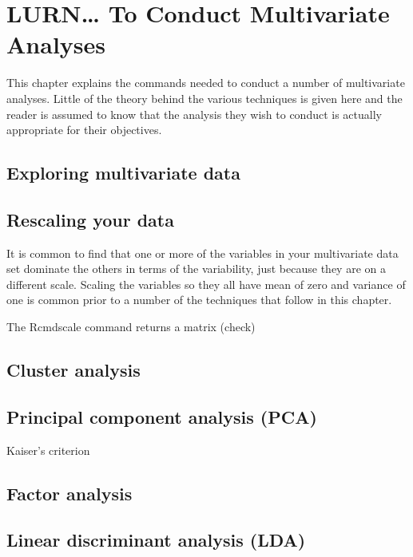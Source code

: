 \chapter{LURN\ldots{} To Conduct Multivariate Analyses}
\label{Multivariate}



This chapter explains the commands needed to conduct a number of multivariate analyses. Little of the theory behind the various techniques is given here and the reader is assumed to know that the analysis they wish to conduct is actually appropriate for their objectives.

\section{Exploring multivariate data}


\section{}


\section{Rescaling your data}

It is common to find that one or more of the variables in your multivariate data set dominate the others in terms of the variability, just because they are on a different scale. Scaling the variables so they all have mean of zero and variance of one is common prior to a number of the techniques that follow in this chapter.

The Rcmd{scale} command returns a matrix (check) 

\section{Cluster analysis}

\section{Principal component analysis (PCA)}

Kaiser's criterion

\section{Factor analysis}

\section{Linear discriminant analysis (LDA)}

